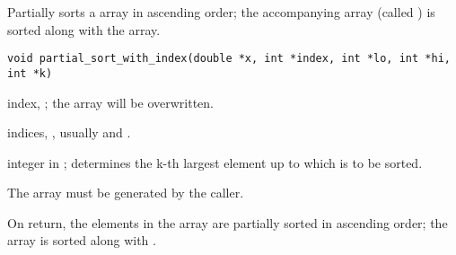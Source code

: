 \documentclass[a4paper,oneside,10pt,DIV=12]{scrreprt}
\begin{document}
\begin{Description}
Partially sorts a  array in ascending order; the accompanying
 array (called ) is sorted along with the array.
\end{Description}
\begin{Usage}
\begin{verbatim}
void partial_sort_with_index(double *x, int *index, int *lo, int *hi, int *k)
\end{verbatim}
\end{Usage}
\begin{Arguments}
	\begin{ldescription}
		\item[\code{index}] index, ; the array will be
			overwritten. 
		\item[\code{lo, hi}] indices, \code{[int]}, usually  and
			.  
		\item[\code{k}] integer in ; determines the k-th largest
			element up to  which  is to be sorted.
	\end{ldescription}
\end{Arguments}
\begin{Details}
	The array  must be generated by the caller.
\end{Details}
\begin{Value}
On return, the elements  in the array  are partially
sorted in ascending order; the array  is sorted along with
.
\end{Value}
\end{document}
